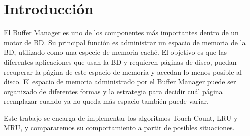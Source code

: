 \section{Introducción}

El Buffer Manager es uno de los componentes más importantes dentro de un
motor de BD. Su principal función es administrar un espacio de memoria de la BD,
utilizado como una especie de memoria caché. El objetivo es que las diferentes
aplicaciones que usan la BD y requieren páginas de disco, puedan recuperar la página de
este espacio de memoria y accedan lo menos posible al disco.
El espacio de memoria administrado por el Buffer Manager puede ser organizado de
diferentes formas y la estrategia para decidir cuál página reemplazar cuando ya no queda
más espacio también puede variar.


Este trabajo se encarga de implementar los algoritmos Touch Count, LRU y MRU, y compararemos su comportamiento 
a partir de posibles situaciones.
